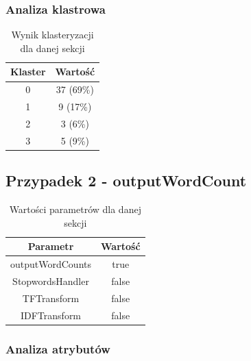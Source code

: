 \documentclass[../EDI_Task2_Karwowski_Kowalewski.tex]{subfiles}
\begin{document}
{{        \subsubsection{Analiza klastrowa} {

            \begin{table}[!htbp]
                \small
                \centering
                \begin{tabular}{|c|c|}
                    \hline
                    Klaster & Wartość \\ \hline
                    0   &  37 (69\%) \\
                    1   &   9 (17\%) \\
                    2   &   3 (6\%) \\
                    3   &   5 (9\%) \\ \hline
                \end{tabular}
                \caption{Wynik klasteryzacji dla danej sekcji}
            \end{table}
            \FloatBarrier
        }
    }

    \subsection{Przypadek 2 - outputWordCount} {

        \begin{table}[!htbp]
            \small
            \centering
            \begin{tabular}{|c|c|}
                \hline
                Parametr & Wartość \\ \hline
                outputWordCounts & true \\ \hline
                StopwordsHandler & false \\ \hline
                TFTransform & false \\ \hline
                IDFTransform & false \\ \hline
            \end{tabular}
            \caption{Wartości parametrów dla danej sekcji}
        \end{table}
        \FloatBarrier

        \subsubsection{Analiza atrybutów} {

}}}
\end{document}
